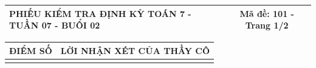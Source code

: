 \documentclass[12pt,a4paper]{article}
\begin{document}
\pagestyle{empty}

\noindent
\begin{tabularx}{\linewidth}{|X|c|}
\hline
\textbf{PHIẾU KIỂM TRA ĐỊNH KỲ TOÁN 7 - TUẦN 07 - BUỔI 02} & \textbf{Mã đề: 101 - Trang 1/2} \\
\hline
\end{tabularx}

\vspace{1.2mm}

\noindent
\begin{tabularx}{\linewidth}{|p{3.2cm}|X|}
\hline
\centering\textbf{ĐIỂM SỐ} & \centering\textbf{LỜI NHẬN XÉT CỦA THẦY CÔ} \tabularnewline
\hline
\rule{0pt}{1.8cm} & \tabularnewline
\hline
\end{tabularx}

\vspace{1.5mm}
\end{document}
